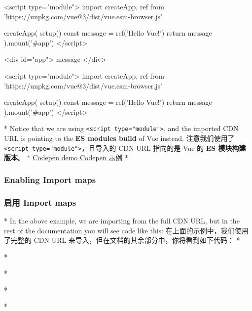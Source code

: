 \begin{paracol}{2}
\begin{codeHtml}
<script type="module">
    import { createApp, ref } from 'https://unpkg.com/vue@3/dist/vue.esm-browser.js'

    createApp({
    setup() {
        const message = ref('Hello Vue!')
        return {
        message
        }
    }
    }).mount('#app')
</script>
\end{codeHtml}  
\switchcolumn
\begin{codeHtml}
<div id="app">{{ message }}</div>

<script type="module">
    import { createApp, ref } from 'https://unpkg.com/vue@3/dist/vue.esm-browser.js'

    createApp({
    setup() {
        const message = ref('Hello Vue!')
        return {
        message
        }
    }
    }).mount('#app')
</script>
\end{codeHtml}  
\switchcolumn[0]*%
Notice that we are using
\texttt{\textless{}script\ type="module"\textgreater{}}, and the
imported CDN URL is pointing to the \textbf{ES modules build} of Vue
instead.
\switchcolumn
注意我们使用了
\texttt{\textless{}script\ type="module"\textgreater{}}，且导入的 CDN
URL 指向的是 Vue 的 \textbf{ES 模块构建版本}。
\switchcolumn[0]*%
\href{https://codepen.io/vuejs-examples/pen/MWzazEv}{Codepen demo}
\switchcolumn
\href{https://codepen.io/vuejs-examples/pen/MWzazEv}{Codepen 示例}
\switchcolumn[0]*%
\subsubsection{Enabling Import maps}
\switchcolumn
\subsubsection{启用 Import maps}
\switchcolumn[0]*%
In the above example, we are importing from the full CDN URL, but in the
rest of the documentation you will see code like this:
\switchcolumn
在上面的示例中，我们使用了完整的 CDN URL
来导入，但在文档的其余部分中，你将看到如下代码：
\switchcolumn[0]*%

\switchcolumn

\switchcolumn[0]*%

\switchcolumn

\switchcolumn[0]*%

\switchcolumn


\switchcolumn[0]*%

\switchcolumn


\switchcolumn[0]*%


\end{paracol}
